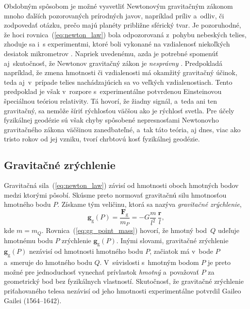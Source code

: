\documentclass[a4paper, 12pt]{book}
\newcommand{\gidx}{\mathrm g}
\let\vec\mathbf
\begin{document}
Obdobným spôsobom je možné vysvetliť Newtonovým gravitačným zákonom mnoho
ďalších pozorovaných prírodných javov, napríklad príliv a~odliv, či zodpovedať
otázku, prečo majú planéty približne sférický tvar.  Je pozoruhodné, že hoci
rovnica~(\ref{eq:newton_law}) bola odpozorovaná z~pohybu nebeských telies,
zhoduje sa i~s experimentmi, ktoré boli vykonané na vzdialenosť niekoľkých
desiatok mikrometrov \citep{Lee2020}.  Napriek uvedenému, azda je potrebné
spomenúť aj~skutočnosť, že Newtonov gravitačný zákon je \emph{nesprávny}
\citep{Feynman}.  Predpokladá napríklad, že zmena hmotnosti či vzdialenosti má
okamžitý gravitačný účinok, teda aj~v~prípade telies nachádzajúcich sa vo
veľkých vzdialenostiach.  Tento predpoklad je však v~rozpore s~experimentálne
potvrdenou Einsteinovou špeciálnou teóriou relativity.  Tá hovorí, že žiadny
signál, a~teda ani ten gravitačný, sa nemôže šíriť rýchlosťou väčšou ako je
rýchlosť svetla.  Pre účely fyzikálnej geodézie sú však chyby spôsobené
nepresnosťami Newtonovho gravitačného zákona väčšinou zanedbateľné, a~tak táto
teória, aj dnes, viac ako tristo rokov od jej vzniku, tvorí chrbtovú kosť
fyzikálnej geodézie.






\subsection{Gravitačné zrýchlenie}
\label{sec:gg}

Gravitačná sila~(\ref{eq:newton_law}) závisí od hmotnosti oboch hmotných
bodov medzi ktorými pôsobí.  Skúsme preto normovať gravitačnú silu hmotnosťou
hmotného bodu $P$.  Získame tým veličinu, ktorá sa nazýva \emph{gravitačné
zrýchlenie},
%
\begin{equation}
\label{eq:gg_point_mass}
\vec g_\gidx(P) = \frac{\vec F_\gidx}{m_P} = -G \frac{m}{l^2} \, \frac{\vec
r}{l}{,}
\end{equation}
%
kde $m = m_Q$.  Rovnica~(\ref{eq:gg_point_mass}) hovorí, že hmotný
bod~$Q$ udeľuje hmotnému bodu $P$ zrýchlenie $\vec g_\gidx(P)$.   Inými
slovami, gravitačné zrýchlenie $\vec g_\gidx(P)$ nezávisí od hmotnosti hmotného
bodu $P$, začiatok má v~bode $P$ a~smeruje do hmotného bodu $Q$.  V~súvislosti
s~hmotným bodom $P$ je preto možné pre jednoduchosť vynechať prívlastok
\emph{hmotný} a~považovať $P$ za geometrický bod bez fyzikálnych vlastností.
Skutočnosť, že gravitačné zrýchlenie priťahovaného telesa nezávisí od jeho
hmotnosti experimentálne potvrdil Gaileo Gailei (1564--1642).
\end{document}
